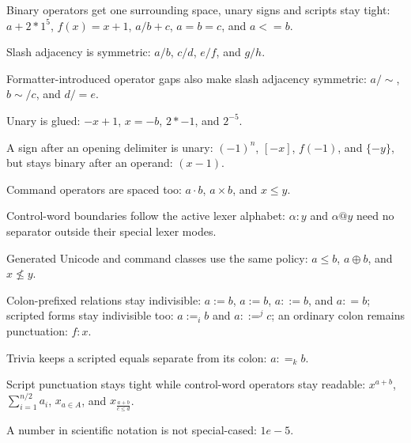 Binary operators get one surrounding space, unary signs and scripts stay tight:
$a+2*1^5$, $f(x)=x+1$, $a/b+c$, $a=b=c$, and $a<=b$.

Slash adjacency is symmetric: $a/b$, $c / d$, $e/ f$, and $g /h$.

Formatter-introduced operator gaps also make slash adjacency symmetric:
$a/\sim$, $b\sim/c$, and $d/=e$.

Unary is glued: $-x+1$, $x=-b$, $2*-1$, and $2^{-5}$.

A sign after an opening delimiter is unary: $(-1)^n$, $[-x]$, $f(-1)$, and
$\{-y\}$, but stays binary after an operand: $(x-1)$.

Command operators are spaced too: $a\cdot b$, $a\times b$, and $x\leq y$.

Control-word boundaries follow the active lexer alphabet: $\alpha:y$ and
$\alpha@y$ need no separator outside their special lexer modes.

Generated Unicode and command classes use the same policy: $a≤b$, $a⊕b$, and
$x\nleq y$.

Colon-prefixed relations stay indivisible: $a:=b$, $a := b$, $a::=b$, and
$a : = b$; scripted forms stay indivisible too: $a:=_i b$ and $a::=^j c$; an
ordinary colon remains punctuation: $f:x$.

Trivia keeps a scripted equals separate from its colon: $a : =_k b$.

Script punctuation stays tight while control-word operators stay readable: $x^{a + b}$,
$\sum_{i = 1}^{n / 2} a_i$, $x_{a \in A}$, and
$x_{\frac{a + b}{c \leq d}}$.

A number in scientific notation is not special-cased: $1e-5$.
